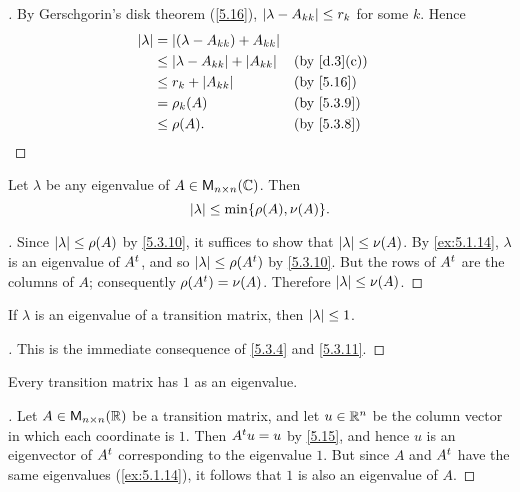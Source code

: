 \begin{proof}[]
	By Gerschgorin's disk theorem (\cref{5.16}), \(\left\lvert\lambda - A_{k k}\right\rvert \leq r_k\) for some \(k\).
	Hence
	\begin{align*}
		\abs{\lambda} & = \abs{(\lambda - A_{k k}) + A_{k k}}                         \\
		              & \leq \abs{\lambda - A_{k k}} + \abs{A_{k k}} &  & \by{d.3}[c] \\
		              & \leq r_k + \abs{A_{k k}}                     &  & \by{5.16}   \\
		              & = \rho_k(A)                                  &  & \by{5.3.9}  \\
		              & \leq \rho(A).                                &  & \by{5.3.8}
	\end{align*}
\end{proof}

\begin{cor}\label{5.3.11}
	Let \(\lambda\) be any eigenvalue of \(A \in \ms[n][n][\C]\).
	Then
	\[
		\abs{\lambda} \leq \min\set{\rho(A), \nu(A)}.
	\]
\end{cor}

\begin{proof}[]
	Since \(\left\lvert\lambda\right\rvert \leq \rho(A)\) by \cref{5.3.10}, it suffices to show that \(\left\lvert\lambda\right\rvert \leq \nu(A)\).
	By \cref{ex:5.1.14}, \(\lambda\) is an eigenvalue of \({A}^{t}\), and so \(\left\lvert\lambda\right\rvert \leq \rho({A}^{t})\) by \cref{5.3.10}.
	But the rows of \({A}^{t}\) are the columns of \(A\);
	consequently \(\rho({A}^{t}) = \nu(A)\).
	Therefore \(\left\lvert\lambda\right\rvert \leq \nu(A)\).
\end{proof}

\begin{cor}\label{5.3.12}
	If \(\lambda\) is an eigenvalue of a transition matrix, then \(\left\lvert\lambda\right\rvert \leq 1\).
\end{cor}

\begin{proof}[]
	This is the immediate consequence of \cref{5.3.4} and \cref{5.3.11}.
\end{proof}

\begin{thm}\label{5.17}
	Every transition matrix has \(1\) as an eigenvalue.
\end{thm}

\begin{proof}[]
	Let \(A \in \ms[n][n][\R]\) be a transition matrix, and let \(u \in \mathbb{R}^n\) be the column vector in which each coordinate is \(1\).
	Then \({A}^{t} u = u\) by \cref{5.15}, and hence \(u\) is an eigenvector of \({A}^{t}\) corresponding to the eigenvalue \(1\).
	But since \(A\) and \({A}^{t}\) have the same eigenvalues (\cref{ex:5.1.14}), it follows that \(1\) is also an eigenvalue of \(A\).
\end{proof}

